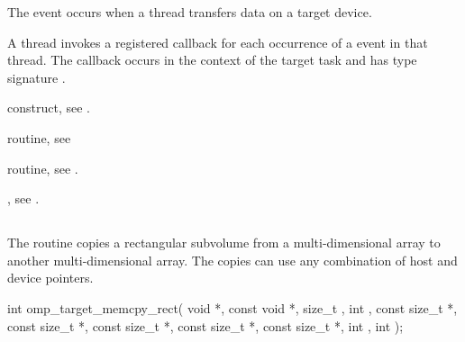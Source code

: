 \events
The  event occurs when a thread transfers data on a target device.

\tools
A thread invokes a registered 
callback for each occurrence of a  event in that 
thread. The callback occurs in the context of the target task and has 
type signature .

\begin{crossrefs}
\item {} construct, see .

\item {} routine, see

\item {} routine, see .


\item {}, see
.
\end{crossrefs}



\subsection{}
\label{subsec:omp_target_memcpy_rect}
\summary
The  routine copies a rectangular subvolume from
a multi-dimensional array to another multi-dimensional array. The copies can
use any combination of host and device pointers.

\format
\begin{samepage}
\begin{ccppspecific}
\begin{ompcFunction}
int omp_target_memcpy_rect(
  void *,
  const void *,
  size_t ,
  int ,
  const size_t *,
  const size_t *,
  const size_t *,
  const size_t *,
  const size_t *,
  int ,
  int 
);
\end{ompcFunction}
\end{ccppspecific}
\end{samepage}

